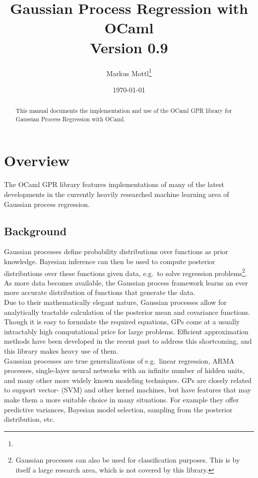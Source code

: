 \documentclass[10pt]{report}
\title{Gaussian Process Regression with OCaml\\Version 0.9}
\author{Markus Mottl\footnote{\mail}}
\date{\today}
\begin{document}
\maketitle

\begin{abstract}

This manual documents the implementation and use of the OCaml GPR
library for Gaussian Process Regression with OCaml.

\end{abstract}

\tableofcontents

\chapter{Overview}

The OCaml GPR library features implementations of many of the latest
developments in the currently heavily researched machine learning
area of Gaussian process regression.

\section{Background}

Gaussian processes define probability distributions over functions
as prior knowledge.  Bayesian inference can then be used to compute
posterior distributions over these functions given data, e.g.\ to
solve regression problems\footnote{Gaussian processes can also be
used for classification purposes.  This is by itself a large research
area, which is not covered by this library.}.  As more data becomes
available, the Gaussian process framework learns an ever more
accurate distribution of functions that generate the data.\\

Due to their mathematically elegant nature, Gaussian processes allow
for analytically tractable calculation of the posterior mean and
covariance functions.  Though it is easy to formulate the required
equations, GPs come at a usually intractably high computational
price for large problems.  Efficient approximation methods have
been developed in the recent past to address this shortcoming, and
this library makes heavy use of them.\\

Gaussian processes are true generalizations of e.g.\ linear regression,
ARMA processes, single-layer neural networks with an infinite number
of hidden units, and many other more widely known modeling techniques.
GPs are closely related to support vector- (SVM) and other kernel
machines, but have features that may make them a more suitable
choice in many situations.  For example they offer predictive
variances, Bayesian model selection, sampling from the posterior
distribution, etc.\\
\end{document}
